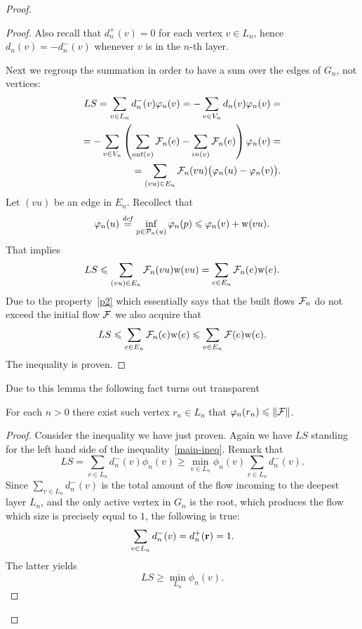 \documentclass[12pt]{article}
\begin{document}
\begin{proof}
\begin{proof}
        Also recall that $d_n^{+}(v) = 0$ for each vertex $v \in L_n$, hence $d_n(v) = -d_n^{-}(v)$ whenever $v$ is in the $n$-th layer.

        Next we regroup the summation in order to have a sum over the edges of $G_n$, not vertices:
        \begin{align*}
          LS = \sum\limits_{v \in L_n} d_n^{-}(v) \varphi_n(v) = -\sum\limits_{v \in V_n} d_n(v) \varphi_n(v) =\\
          =-\sum_{v \in V_n} \left(\sum_{out(v)} \mathcal{F}_{n}(e) - \sum_{in(v)}\mathcal{F}_{n}(e) \right) \varphi_n(v)=\\
          =\sum_{(vu) \in E_n} \mathcal{F}_{n}(vu) \big(\varphi_n(u) - \varphi_n(v)\big).
        \end{align*}
        Let $(vu)$ be an edge in $E_n$. Recollect that
        \[
          \varphi_n(u) \overset{\mathit{def}}{=} \inf_{p \in \mathcal{P}_n(u)} \varphi_n(p) \leqslant \varphi_n(v) + \mathrm{w}(vu).
        \]
        That implies
        \[
          LS\leqslant \sum_{(vu) \in E_n} \mathcal{F}_{n}(vu) \mathrm{w}(vu) = \sum_{e \in E_n} \mathcal{F}_{n}(e) \mathrm{w}(e).
        \]
        Due to the property~\ref{p2} which essentially says that the built flows $\mathcal{F}_{n}$ do not exceed the initial flow $\mathcal{F}$ 
          we also acquire that
        \[
          LS\leqslant \sum_{e \in E_n} \mathcal{F}_{n}(e) \mathrm{w}(e) \leqslant \sum_{e \in E_n} \mathcal{F}(e) \mathrm{w}(e).
        \]
        The inequality is proven.
      \end{proof}
      Due to this lemma the following fact turns out transparent
      \begin{prop}
        For each $n > 0$ there exist such vertex $r_n \in L_n$ that $\varphi_n(r_n) \leqslant \|\mathcal{F}\|$.
      \end{prop}
      \begin{proof}
        Consider the inequality we have just proven.
        Again we have $LS$ standing for the left hand side of the inequality~\eqref{main-ineq}.
        Remark that
        \[
          LS = \sum_{v \in L_n}d^{-}_n(v) \phi_n(v) \geq \min_{v \in L_n}\phi_n(v) \sum_{v \in L_n} d^{-}_n(v).
        \]
        Since $\sum\limits_{v \in L_n} d^{-}_n(v)$ is the total amount of the flow incoming to the deepest layer $L_n$, and the only
          active vertex in $G_n$ is the root, which produces the flow which size is precisely equal to $1$, the following is true:
        \[
          \sum_{v \in L_n} d^{-}_n(v) = d^{+}_n(\mathbf{r}) = 1.
        \]
        The latter yields
        \[
          LS \geq \min_{L_n} \phi_n(v).
        \]


\end{proof}
\end{proof}
\end{document}
